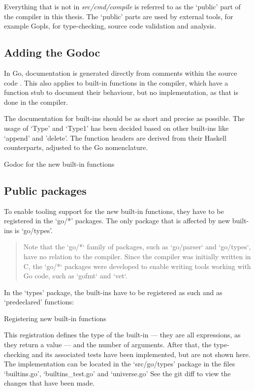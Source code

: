 Everything that is not in \textit{src/cmd/compile} is referred to as the `public'
part of the compiler in this thesis. The `public' parts are used by external
tools, for example Gopls, for type-checking, source code validation and
analysis.

\subsection{Adding the Godoc}
In Go, documentation is generated directly from comments within the source code
\autocite{godoc}. This also applies to built-in functions in the compiler, which
have a function stub to document their behaviour\autocite{godoc-builtin}, but
no implementation, as that is done in the compiler\autocite{builtin-impl}.

The documentation for built-ins should be as short and precise as possible.
The usage of `Type' and `Type1' has been decided based on other built-ins
like `append' and 'delete'.
The function headers are derived from their Haskell counterparts, adjusted
to the Go nomenclature.

\begin{code}
	\caption{Godoc for the new built-in functions}
\end{code}
\subsection{Public packages}

To enable tooling support for the new built-in functions, they have to be
registered in the `go/*' packages. The only package that is affected by new
built-ins is `go/types'.

\begin{quote}
Note that the `go/*` family of packages, such as `go/parser` and `go/types`,
have no relation to the compiler. Since the compiler was initially written in C,
the `go/*` packages were developed to enable writing tools working with Go code,
such as `gofmt` and `vet`.\autocite{compiler-readme}
\end{quote}

In the `types' package, the built-ins have to be registered as such and as
`predeclared' functions:

\begin{code}
	\caption{Registering new built-in functions}
\end{code}
This registration defines the type of the built-in --- they are all expressions,
as they return a value --- and the number of arguments.
After that, the type-checking and its associated tests have been implemented, but
are not shown here. The implementation can be located in the `src/go/types' package
in the files `builtins.go', `builtins\_test.go' and `universe.go' See the git
diff\autocite{ba-go1-14-thesis-diff} to view the changes that have been made.

